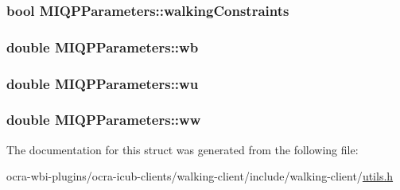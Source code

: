 \hypertarget{structMIQPParameters_af7cbaa08836e17417f9f5c170b55f1bc}{
\subsubsection[{walking\-Constraints}]{\setlength{\rightskip}{0pt plus 5cm}bool {\bf \-M\-I\-Q\-P\-Parameters\-::walking\-Constraints}}}\label{structMIQPParameters_af7cbaa08836e17417f9f5c170b55f1bc}
\hypertarget{structMIQPParameters_a6bc828e6060bfd69c3d6353a460de86b}{
\subsubsection[{wb}]{\setlength{\rightskip}{0pt plus 5cm}double {\bf \-M\-I\-Q\-P\-Parameters\-::wb}}}\label{structMIQPParameters_a6bc828e6060bfd69c3d6353a460de86b}
\hypertarget{structMIQPParameters_aed141afdcc25904d53526a5f2c977427}{
\subsubsection[{wu}]{\setlength{\rightskip}{0pt plus 5cm}double {\bf \-M\-I\-Q\-P\-Parameters\-::wu}}}\label{structMIQPParameters_aed141afdcc25904d53526a5f2c977427}
\hypertarget{structMIQPParameters_a7223a1cda1e4565d18729f1e7bba87e0}{
\subsubsection[{ww}]{\setlength{\rightskip}{0pt plus 5cm}double {\bf \-M\-I\-Q\-P\-Parameters\-::ww}}}\label{structMIQPParameters_a7223a1cda1e4565d18729f1e7bba87e0}


\-The documentation for this struct was generated from the following file\-:\begin{DoxyCompactItemize}
\item 
ocra-\/wbi-\/plugins/ocra-\/icub-\/clients/walking-\/client/include/walking-\/client/\hyperlink{utils_8h}{utils.\-h}\end{DoxyCompactItemize}
